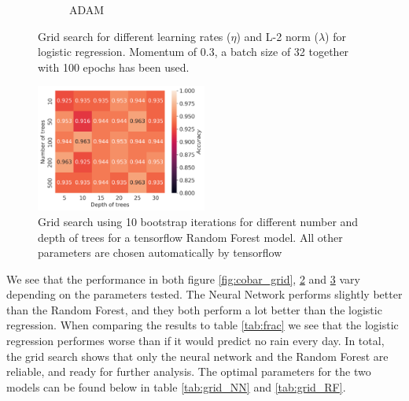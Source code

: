 \documentclass[11pt]{article}
\begin{document}
\begin{figure}[H]
\begin{subfigure}{.5\textwidth}
        \caption{ADAM}
        \label{fig:}
    \end{subfigure}
    \caption{Grid search for different learning rates ($\eta$) and L-2 norm ($\lambda$) for logistic regression. Momentum of 0.3, a batch size of 32 together with 100 epochs has been used.}
    \label{fig:cobar_grid_logreg}
\end{figure}
\begin{figure}[H]
    \centering
    \includegraphics[width=0.5\textwidth]{../figures/RF_grid_bootstrap_cobar.png}
    \caption{Grid search using 10 bootstrap iterations for different number and depth of trees for a tensorflow Random Forest model. All other parameters are chosen automatically by tensorflow}
    \label{fig:cobar_grid_rf}
\end{figure}

We see that the performance in both figure \ref{fig:cobar_grid}, \ref{fig:cobar_grid_logreg} and \ref{fig:cobar_grid_rf} vary depending on the parameters tested. The Neural Network performs slightly better than the Random Forest, and they both perform a lot better than the logistic regression. When comparing the results to table \ref{tab:frac} we see that the logistic regression performes worse than if it would predict no rain every day. In total, the grid search shows that only the neural network and the Random Forest are reliable, and ready for further analysis.  The optimal parameters for the two models can be found below in table \ref{tab:grid_NN} and \ref{tab:grid_RF}.
\end{document}
